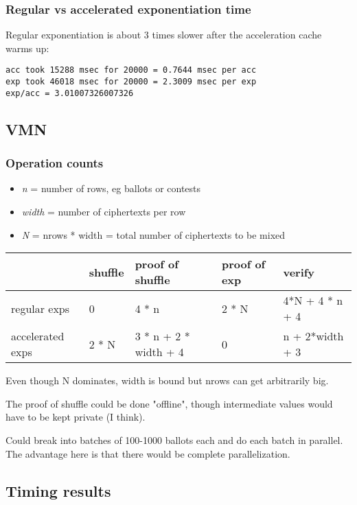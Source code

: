 \documentclass{article}
\begin{document}
\subsubsection*{Regular vs accelerated exponentiation time}

Regular exponentiation is about 3 times slower after the acceleration
cache warms up:
\begin{verbatim}
acc took 15288 msec for 20000 = 0.7644 msec per acc
exp took 46018 msec for 20000 = 2.3009 msec per exp
exp/acc = 3.01007326007326
\end{verbatim}

\subsection*{VMN}

\subsubsection*{Operation counts}
\begin{itemize}
\item \emph{n} = number of rows, eg ballots or contests 
\item \emph{width} = number of ciphertexts per row 
\item \emph{N} = nrows {*} width = total number of ciphertexts to be mixed 
\end{itemize}

\begin{longtable}[c]{@{}lllll@{}}
\toprule 
 & shuffle  & proof of shuffle  & proof of exp  & verify\tabularnewline
\endhead
\midrule 
regular exps  & 0  & 4 {*} n  & 2 {*} N  & 4{*}N + 4 {*} n + 4\tabularnewline
accelerated exps  & 2 {*} N  & 3 {*} n + 2 {*} width + 4  & 0  & n + 2{*}width + 3\tabularnewline
\bottomrule
\end{longtable}

Even though N dominates, width is bound but nrows can get arbitrarily
big.

The proof of shuffle could be done "offline", though intermediate
values would have to be kept private (I think).

Could break into batches of 100-1000 ballots each and do each batch
in parallel. The advantage here is that there would be complete parallelization.

\subsection*{Timing results}
\end{document}
